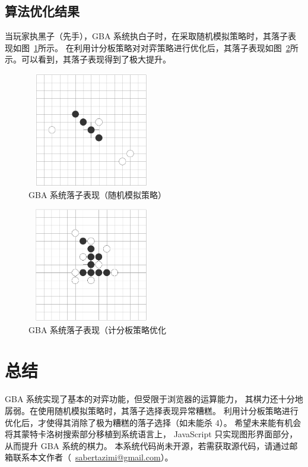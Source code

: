 \documentclass[UTF8,cs4size]{ctexart}
\begin{document}
\subsection{算法优化结果}
当玩家执黑子（先手），GBA 系统执白子时，在采取随机模拟策略时，其落子表现如图~\ref{fig:mcts_gba_v1}所示。
在利用计分板策略对对弈策略进行优化后，其落子表现如图~\ref{fig:mcts_gba_v2}所示。可以看到，其落子表现得到了极大提升。

\begin{figure}[htb]
  \centering
  \includegraphics[width=0.5\textwidth,height=5cm]{figures/final_gba_v1.png}
  \caption{GBA 系统落子表现（随机模拟策略）}
  \label{fig:mcts_gba_v1}
\end{figure}

\begin{figure}[htb]
  \centering
  \includegraphics[width=0.5\textwidth,height=5cm]{figures/final_gba_v2.png}
  \caption{GBA 系统落子表现（计分板策略优化}
  \label{fig:mcts_gba_v2}
\end{figure}

\clearpage

\section{总结}
GBA 系统实现了基本的对弈功能，但受限于浏览器的运算能力，
其棋力还十分地孱弱。在使用随机模拟策略时，其落子选择表现异常糟糕。
利用计分板策略进行优化后，才使得其消除了极为糟糕的落子选择（如未能杀 4）。
希望未来能有机会将其蒙特卡洛树搜索部分移植到系统语言上，
JavaScript 只实现图形界面部分，从而提升 GBA 系统的棋力。
本系统代码尚未开源，若需获取源代码，请通过邮箱联系本文作者（~\href{mailto:sabertazimi@gmail.com}{sabertazimi@gmail.com}）。
\newpage



\newpage
\end{document}
